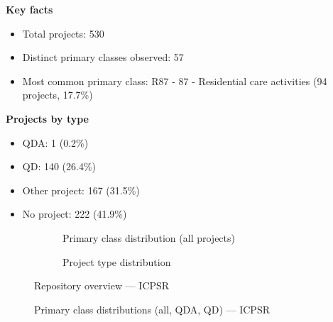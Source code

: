 \textbf{Key facts}

\begin{itemize}
    \item Total projects: 530
    \item Distinct primary classes observed: 57
    \item Most common primary class: R87 - 87 - Residential care activities (94 projects, 17.7\%)
\end{itemize}

\textbf{Projects by type}

\begin{itemize}
    \item QDA: 1 (0.2\%)
    \item QD: 140 (26.4\%)
    \item Other project: 167 (31.5\%)
    \item No project: 222 (41.9\%)
\end{itemize}

\begin{figure}[H]
    \centering
    \begin{subfigure}[t]{0.49\textwidth}
        \centering
        
        \caption{Primary class distribution (all projects)}
    \end{subfigure}
    \hfill
    \begin{subfigure}[t]{0.49\textwidth}
        \centering
        
        \caption{Project type distribution}
    \end{subfigure}
    \caption{Repository overview --- ICPSR}
\end{figure}

\clearpage

\begin{figure}[H]
    \centering
    
    \par\vspace{0.8em}
    
    \par\vspace{0.8em}
    
    \caption{Primary class distributions (all, QDA, QD) --- ICPSR}
\end{figure}

\clearpage

